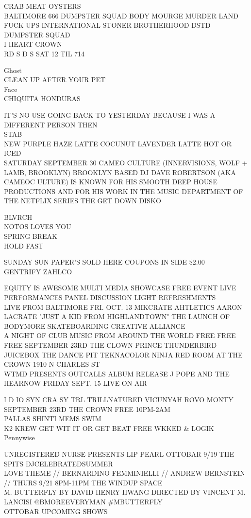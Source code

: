 \documentclass[10pt,letterpaper]{article}
\begin{document}
CRAB MEAT OYSTERS\\
BALTIMORE 666 DUMPSTER SQUAD BODY MOURGE MURDER LAND FUCK UPS INTERNATIONAL STONER BROTHERHOOD DSTD DUMPSTER SQUAD\\
I HEART CROWN\\
RD S D S SAT 12 TIL 714

Ghost\\
CLEAN UP AFTER YOUR PET\\
Face\\
CHIQUITA HONDURAS

IT'S NO USE GOING BACK TO YESTERDAY BECAUSE I WAS A DIFFERENT PERSON THEN\\
STAB\\
NEW PURPLE HAZE LATTE COCUNUT LAVENDER LATTE HOT OR ICED\\
SATURDAY SEPTEMBER 30 CAMEO CULTURE (INNERVISIONS, WOLF + LAMB, BROOKLYN) BROOKLYN BASED DJ DAVE ROBERTSON (AKA CAMEOC ULTURE) IS KNOWN FOR HIS SMOOTH DEEP HOUSE PRODUCTIONS AND FOR HIS WORK IN THE MUSIC DEPARTMENT OF THE NETFLIX SERIES THE GET DOWN DISKO

BLVRCH\\
NOTOS LOVES YOU\\
SPRING BREAK\\
HOLD FAST

SUNDAY SUN PAPER'S SOLD HERE COUPONS IN SIDE \$2.00\\
GENTRIFY ZAHLCO

EQUITY IS AWESOME MULTI MEDIA SHOWCASE FREE EVENT LIVE PERFORMANCES PANEL DISCUSSION LIGHT REFRESHMENTS\\
LIVE FROM BALTIMORE FRI. OCT. 13 MIKCRATE AHTLETICS AARON LACRATE "JUST A KID FROM HIGHLANDTOWN" THE LAUNCH OF BODYMORE SKATEBOARDING CREATIVE ALLIANCE\\
A NIGHT OF CLUB MUSIC FROM AROUND THE WORLD FREE FREE FREE SEPTEMBER 23RD THE CLOWN PRINCE THUNDERBIRD JUICEBOX THE DANCE PIT TEKNACOLOR NINJA RED ROOM AT THE CROWN 1910 N CHARLES ST\\
WTMD PRESENTS OUTCALLS ALBUM RELEASE J POPE AND THE HEARNOW FRIDAY SEPT. 15 LIVE ON AIR

I D IO SYN CRA SY TRL TRILLNATURED VICUNYAH ROVO MONTY SEPTEMBER 23RD THE CROWN FREE 10PM{-}2AM\\
PALLAS SHINTI MEMS SWIM\\
K2 KREW GET WIT IT OR GET BEAT FREE WKKED \& LOGIK\\
Pennywise

UNREGISTERED NURSE PRESENTS LIP PEARL OTTOBAR 9/19 THE SPITS DJCELEBRATEDSUMMER\\
LOVE THEME // BERNARDINO FEMMINIELLI // ANDREW BERNSTEIN // THURS 9/21 8PM{-}11PM THE WINDUP SPACE\\
M. BUTTERFLY BY DAVID HENRY HWANG DIRECTED BY VINCENT M. LANCISI @BMOREEVERYMAN \#MBUTTERFLY\\
OTTOBAR UPCOMING SHOWS
\end{document}
